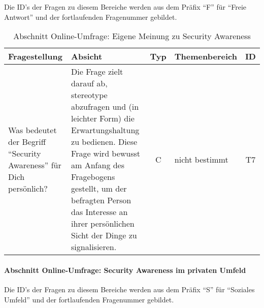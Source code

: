 \documentclass[../../main.tex]{subfiles}
\begin{document}
\begin{sloppypar}
Die ID's der Fragen zu diesem Bereiche werden aus dem Präfix "`F"' für "`Freie Antwort"' und der fortlaufenden Fragenummer gebildet.
\end{sloppypar}


\sloppy 

\begin{table}[H]
\tablefontsize	
\centering
\caption{Abschnitt Online-Umfrage: Eigene Meinung zu Security Awareness}
\label{Eigene Meinung zu Security Awareness}
\begin{tabular}{ |p{5.5cm}|p{5.5cm}|c|p{2.5cm}|c|}

\hline
\tableheaderbgcolor
\textbf{Fragestellung} & \textbf{Absicht} & \textbf{Typ} & \textbf{Themenbereich} & \textbf{ID}\\ 
\hline
Was bedeutet der Begriff "`Security Awareness"' für Dich persönlich? &  Die Frage zielt darauf ab, stereotype abzufragen und (in leichter Form) die Erwartungshaltung zu bedienen. Diese Frage wird bewusst am Anfang des Fragebogens gestellt, um der befragten Person das Interesse an ihrer persönlichen Sicht der Dinge zu signalisieren. & C & nicht bestimmt & T7 \\
\hline

\end{tabular}
\end{table}



\paragraph*{Abschnitt Online-Umfrage: Security Awareness im privaten Umfeld}\mbox{}

\begin{sloppypar}
Die ID's der Fragen zu diesem Bereiche werden aus dem Präfix "`S"' für "`Soziales Umfeld"' und der fortlaufenden Fragenummer gebildet.
\end{sloppypar}


\sloppy 
\end{document}
